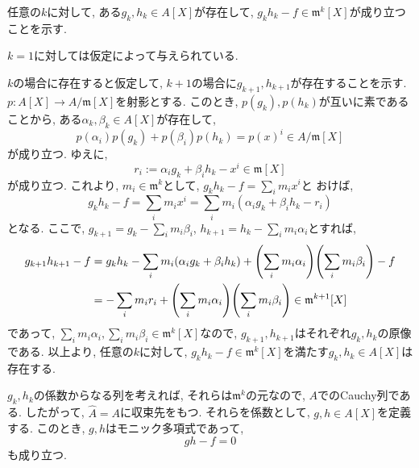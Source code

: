 \documentclass[dvipdfmx]{jsarticle}
\begin{document}
    \begin{problem}
        任意の$k$に対して,
        ある$g_k, h_k \in A[X]$が存在して,
        $g_kh_k-f \in \mathfrak{m}^k[X]$が成り立つことを示す.

        $k = 1$に対しては仮定によって与えられている.

        $k$の場合に存在すると仮定して, $k+1$の場合に$g_{k+1}, h_{k+1}$が存在することを示す.
        $p: A[X] \to A/\mathfrak{m}[X]$を射影とする.
        このとき, $p(g_k), p(h_k)$が互いに素であることから,
        ある$\alpha_k, \beta_k \in A[X]$が存在して,
        \[
            p(\alpha_i)p(g_k) + p(\beta_i)p(h_k)  = p(x)^i \in A/\mathfrak{m}[X]
        \]
        が成り立つ.
        ゆえに,
        \[
            r_i := \alpha_ig_k + \beta_ih_k - x^i \in \mathfrak{m}[X]
        \]
        が成り立つ.
        これより, $m_i \in \mathfrak{m}^k$として, $g_kh_k-f = \sum_{i} m_ix^i$と
        おけば,
        \[
            g_kh_k-f = \sum_{i} m_ix^i = \sum_i m_i(\alpha_ig_k+\beta_ih_k-r_i)
        \]
        となる.
        ここで,
        $g_{k+1} = g_k - \sum_{i} m_i\beta_i$, $h_{k+1} = h_k - \sum_i m_i\alpha_i$とすれば,
        \begin{align*}
            g_{k+1}h_{k+1} - f
            &= g_kh_k - \sum_{i} m_i(\alpha_ig_k+\beta_ih_k) + \qty(\sum_i m_i\alpha_i)\qty(\sum_i m_i\beta_i) - f\\
            &= -\sum_i m_ir_i + \qty(\sum_i m_i\alpha_i)\qty(\sum_i m_i\beta_i) \in \mathfrak{m}^{k+1}[X]
        \end{align*}
        であって, $\sum_i m_i\alpha_i, \sum_im_i\beta_i \in \mathfrak{m}^k[X]$なので,
        $g_{k+1}, h_{k+1}$はそれぞれ$g_k, h_k$の原像である.
        以上より,
        任意の$k$に対して,
        $g_kh_k -f \in \mathfrak{m}^k[X]$を満たす$g_k, h_k \in A[X]$は存在する.

        $g_k, h_k$の係数からなる列を考えれば,
        それらは$\mathfrak{m}^k$の元なので, $A$でのCauchy列である.
        したがって, $\widehat{A} = A$に収束先をもつ.
        それらを係数として, $g, h \in A[X]$を定義する.
        このとき, $g, h$はモニック多項式であって,
        \[
            gh -f  = 0
        \]
        も成り立つ.
    \end{problem}
\end{document}
